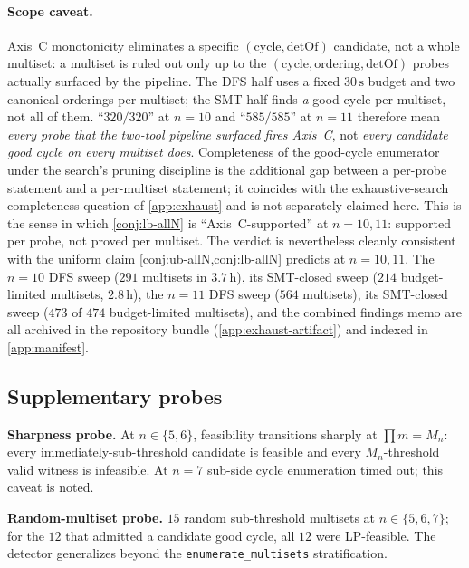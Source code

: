 \documentclass[11pt,a4paper]{article}
\theoremstyle{plain}
\theoremstyle{definition}
\newcommand{\Mn}{M_n}
\newcommand{\detOf}{\mathrm{detOf}}
\begin{document}
\paragraph{Scope caveat.}  Axis~C monotonicity eliminates a
specific $(\mathrm{cycle}, \detOf)$ candidate, not a whole
multiset: a multiset is ruled out only up to the $(\mathrm{cycle},
\mathrm{ordering}, \detOf)$ probes actually surfaced by the
pipeline.  The DFS half uses a fixed $30\,\mathrm{s}$ budget and
two canonical orderings per multiset; the SMT half finds \emph{a}
good cycle per multiset, not all of them.  ``$320 / 320$'' at $n
= 10$ and ``$585 / 585$'' at $n = 11$ therefore mean \emph{every
probe that the two-tool pipeline surfaced fires Axis~C}, not
\emph{every candidate good cycle on every multiset does}.
Completeness of the good-cycle enumerator under the search's
pruning discipline is the additional gap between a per-probe
statement and a per-multiset statement; it coincides with the
exhaustive-search completeness question of \cref{app:exhaust} and
is not separately claimed here.  This is the sense in which
\cref{conj:lb-allN} is ``Axis~C-supported'' at $n = 10, 11$:
supported per probe, not proved per multiset.  The verdict is
nevertheless cleanly consistent with the uniform claim
\cref{conj:ub-allN,conj:lb-allN} predicts at $n = 10, 11$.  The
$n = 10$ DFS sweep ($291$ multisets in $3.7\,\mathrm{h}$), its
SMT-closed sweep ($214$ budget-limited multisets, $2.8\,\mathrm{h}$),
the $n = 11$ DFS sweep ($564$ multisets), its SMT-closed sweep
($473$ of $474$ budget-limited multisets), and the combined
findings memo are all archived in the repository bundle
(\cref{app:exhaust-artifact}) and indexed in \cref{app:manifest}.

\subsection{Supplementary probes}\label{sec:detector-supplementary}

\textbf{Sharpness probe.} At $n \in \{5, 6\}$, feasibility transitions
sharply at $\prod m = \Mn$: every immediately-sub-threshold candidate
is feasible and every $\Mn$-threshold valid witness is infeasible.
At $n = 7$ sub-side cycle enumeration timed out; this caveat is noted.

\textbf{Random-multiset probe.} $15$ random sub-threshold multisets at
$n \in \{5, 6, 7\}$; for the $12$ that admitted a candidate good cycle,
all $12$ were LP-feasible.  The detector generalizes beyond the
\texttt{enumerate\_multisets} stratification.
\end{document}
